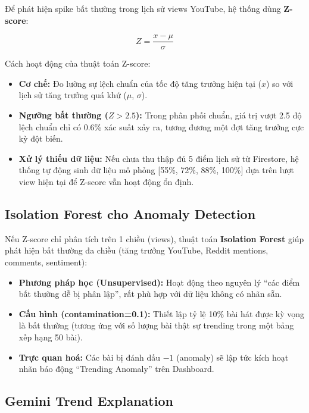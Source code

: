 \documentclass[12pt,a4paper]{report}
\begin{document}
Để phát hiện spike bất thường trong lịch sử views YouTube, hệ thống dùng \textbf{Z-score}:

\begin{equation}
Z = \frac{x - \mu}{\sigma}
\label{eq:zscore}
\end{equation}

Cách hoạt động của thuật toán Z-score:
\begin{itemize}[leftmargin=*]
    \item \textbf{Cơ chế:} Đo lường sự lệch chuẩn của tốc độ tăng trưởng hiện tại ($x$) so với lịch sử tăng trưởng quá khứ ($\mu$, $\sigma$).
    \item \textbf{Ngưỡng bất thường ($Z > 2.5$):} Trong phân phối chuẩn, giá trị vượt 2.5 độ lệch chuẩn chỉ có 0.6\% xác suất xảy ra, tương đương một đợt tăng trưởng cực kỳ đột biến.
    \item \textbf{Xử lý thiếu dữ liệu:} Nếu chưa thu thập đủ 5 điểm lịch sử từ Firestore, hệ thống tự động sinh dữ liệu mô phỏng [55\%, 72\%, 88\%, 100\%] dựa trên lượt view hiện tại để Z-score vẫn hoạt động ổn định.
\end{itemize}

\subsection{Isolation Forest cho Anomaly Detection}

Nếu Z-score chỉ phân tích trên 1 chiều (views), thuật toán \textbf{Isolation Forest} giúp phát hiện bất thường đa chiều (tăng trưởng YouTube, Reddit mentions, comments, sentiment):
\begin{itemize}[leftmargin=*]
    \item \textbf{Phương pháp học (Unsupervised):} Hoạt động theo nguyên lý ``các điểm bất thường dễ bị phân lập'', rất phù hợp với dữ liệu không có nhãn sẵn.
    \item \textbf{Cấu hình (contamination=0.1):} Thiết lập tỷ lệ 10\% bài hát được kỳ vọng là bất thường (tương ứng với số lượng bài thật sự trending trong một bảng xếp hạng 50 bài).
    \item \textbf{Trực quan hoá:} Các bài bị đánh dấu $-1$ (anomaly) sẽ lập tức kích hoạt nhãn báo động ``Trending Anomaly'' trên Dashboard.
\end{itemize}

\subsection{Gemini Trend Explanation}
\end{document}
